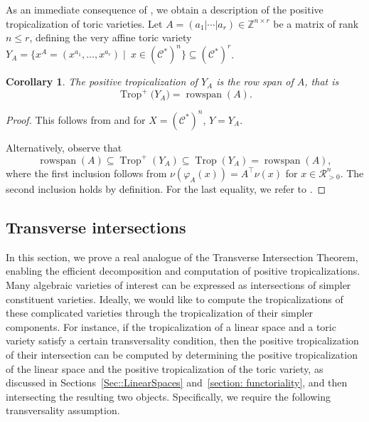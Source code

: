 \documentclass{article}
\newtheorem{corollary}[theorem]{Corollary}
\theoremstyle{definition}
\DeclareMathOperator{\Trop}{Trop}
\DeclareMathOperator{\rowspan}{rowspan}
\newcommand{\CC}{\mathcal{C}}
\begin{document}
As an immediate consequence of , we obtain a description of the positive tropicalization of  toric varieties.
Let $A = (a_1 | \cdots | a_r) \in \mathbb{Z}^{n \times r}$ be a matrix of rank $n \leq r$, defining the very affine toric variety 
$Y_A = \{x^A = (x^{a_1}, \dots, x^{a_r}) \mid \ x \in (\mathcal{C}^*)^n\} \subseteq (\mathcal{C}^*)^r$.
\begin{corollary}
\label{Cor::PosTropMono}
    The positive tropicalization of $Y_A$ is the row span of $A$, that is
     \[\Trop^+\big( 
 Y_A \big) = \rowspan(A).\]
\end{corollary}
\begin{proof}
    This follows from  and  for $X = (\CC^*)^n$, $Y = Y_A$.

    Alternatively, observe that
    \[ \rowspan(A) \subseteq \Trop^+(Y_A) \subseteq \Trop(Y_A) = \rowspan(A),\]
    where the first inclusion follows from $\nu(\varphi_A(x)) = A^\top \nu(x)$ for $x \in \mathcal{R}^n_{>0}$. The second inclusion holds by definition. For the last equality, we refer to  \cite[Theorem 5.5.1]{maclagan2015introduction}.
\end{proof}





\subsection{Transverse intersections}


In this section, we prove a real analogue of the Transverse Intersection Theorem, enabling the efficient decomposition and computation of positive tropicalizations.
    Many algebraic varieties of interest can be expressed as intersections of simpler
    constituent varieties. Ideally, we would like to compute the tropicalizations of these complicated varieties through the tropicalization of their simpler components.
     For instance, if the tropicalization of a linear space and a toric variety satisfy a certain transversality condition, then the positive tropicalization of their intersection can be computed by determining the positive tropicalization of the linear space and the positive tropicalization of the toric variety, as discussed in Sections~\ref{Sec::LinearSpaces} and~\ref{section: functoriality}, and then intersecting the resulting two objects. Specifically, we require the following transversality assumption.
\end{document}
